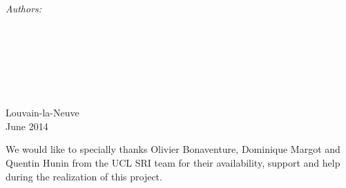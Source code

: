 \documentclass[11pt, a4paper, oneside]{Packages/Thesis}
\begin{document}
\begin{titlepage}
\begin{center}
\begin{minipage}{0.4\textwidth}
\begin{center} \large
\emph{Authors:}\\
{\authornames} %
\end{center}
\end{minipage}
\\[3cm]
\\
\\
\\
\\
\\[1.5cm] %
 
{\large Louvain-la-Neuve\\ June 2014}\\[4cm] %
 
\vfill
\end{center}

\end{titlepage}

\clearpage
\pagestyle{empty} %

\null\vfill %

We would like to specially thanks Olivier Bonaventure, Dominique Margot and Quentin Hunin from the UCL SRI team  for their availability, support and help during the realization of this project.


\vfill\vfill\vfill\vfill\vfill\vfill\null %

\clearpage %
\end{document}
